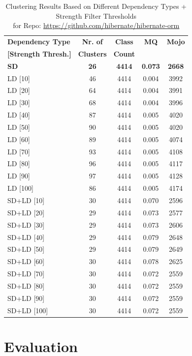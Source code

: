 \documentclass{ieeeaccess}
\begin{document}
\begin{table}[h]
\caption{Clustering Results Based on Different Dependency Types + Strength Filter Thresholds \\ for Repo: \href{https://github.com/hibernate/hibernate-orm}{https://github.com/hibernate/hibernate-orm}}
\label{tab:clustering_results}
\centering
\setlength{\tabcolsep}{10pt}
\begin{tabular}{|l|c|c|c|c|}
\hline
\textbf{Dependency Type} & \textbf{Nr. of} & \textbf{Class} & \textbf{MQ} & \textbf{Mojo} \\
\textbf{[Strength Thresh.]} & \textbf{Clusters} & \textbf{Count} &  &  \\
\hline
\textbf{SD} & \textbf{26} & \textbf{4414} & \textbf{0.073} & \textbf{2668} \\
LD [10] & 46 & 4414 & 0.004 & 3992 \\
LD [20] & 64 & 4414 & 0.004 & 3991 \\
LD [30] & 68 & 4414 & 0.004 & 3996 \\
LD [40] & 87 & 4414 & 0.005 & 4020 \\
LD [50] & 90 & 4414 & 0.005 & 4020 \\
LD [60] & 89 & 4414 & 0.005 & 4074 \\
LD [70] & 93 & 4414 & 0.005 & 4108 \\
LD [80] & 96 & 4414 & 0.005 & 4117 \\
LD [90] & 97 & 4414 & 0.005 & 4128 \\
LD [100] & 86 & 4414 & 0.005 & 4174 \\
\hline
SD+LD [10] & 30 & 4414 & 0.070 & 2596 \\
SD+LD [20] & 29 & 4414 & 0.073 & 2577 \\
SD+LD [30] & 29 & 4414 & 0.073 & 2606 \\
SD+LD [40] & 29 & 4414 & 0.079 & 2648 \\
SD+LD [50] & 29 & 4414 & 0.079 & 2649 \\
SD+LD [60] & 30 & 4414 & 0.078 & 2625 \\
SD+LD [70] & 30 & 4414 & 0.072 & 2559 \\
SD+LD [80] & 30 & 4414 & 0.072 & 2559 \\
SD+LD [90] & 30 & 4414 & 0.072 & 2559 \\
SD+LD [100] & 30 & 4414 & 0.072 & 2559 \\
\hline
\end{tabular}
\end{table}

\section{Evaluation}
\label{sec:evaluation}
\end{document}
